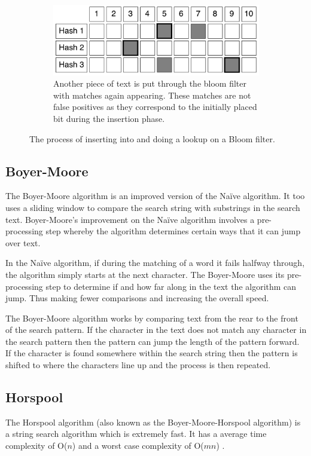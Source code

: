 \documentclass{article}
\begin{document}
\begin{figure}[h!bt]
  \ContinuedFloat  
  \label{bloom-6}
  \centering
  \begin{subfigure}{\textwidth}
  \makeatletter
  \includegraphics[width=\textwidth]{images/bloom-6}
  \caption{Another piece of text is put through the bloom filter with matches again appearing. These matches are not false positives as they correspond to the initially placed bit during the insertion phase.}
  \end{subfigure}
  \caption{The process of inserting into and doing a lookup on a Bloom filter.}
\end{figure}

\subsection{Boyer-Moore} \label{sec:boyer-moore}

The Boyer-Moore algorithm \citep{Boyer1977} is an improved version of the Na{\"i}ve algorithm. It too uses a sliding window to compare the search string with substrings in the search text. Boyer-Moore's improvement on the Na{\"i}ve algorithm involves a pre-processing step whereby the algorithm determines certain ways that it can jump over text.

In the Na{\"i}ve algorithm, if during the matching of a word it fails halfway through, the algorithm simply starts at the next character. The Boyer-Moore uses its pre-processing step to determine if and how far along in the text the algorithm can jump. Thus making fewer comparisons and increasing the overall speed.

The Boyer-Moore algorithm works by comparing text from the rear to the front of the search pattern. If the character in the text does not match any character in the search pattern then the pattern can jump the length of the pattern forward. If the character is found somewhere within the search string then the pattern is shifted to where the characters line up and the process is then repeated.

\subsection{Horspool} \label{sec:horspool}
The Horspool algorithm \citep{Horspool1980} (also known as the Boyer-Moore-Horspool algorithm) is a string search algorithm which is extremely fast. It has a average time complexity of O(\(n\)) and a worst case complexity of O(\(mn\)) \citep{Horspool1980}.
\end{document}
